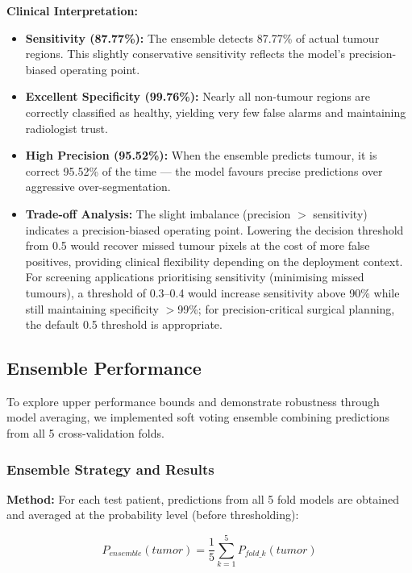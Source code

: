 \documentclass{article}
\begin{document}
\textbf{Clinical Interpretation:}
\begin{itemize}
    \item \textbf{Sensitivity (87.77\%):} The ensemble detects 87.77\% of actual tumour regions. This slightly conservative sensitivity reflects the model's precision-biased operating point.

    \item \textbf{Excellent Specificity (99.76\%):} Nearly all non-tumour regions are correctly classified as healthy, yielding very few false alarms and maintaining radiologist trust.

    \item \textbf{High Precision (95.52\%):} When the ensemble predicts tumour, it is correct 95.52\% of the time — the model favours precise predictions over aggressive over-segmentation.

    \item \textbf{Trade-off Analysis:} The slight imbalance (precision $>$ sensitivity) indicates a precision-biased operating point. Lowering the decision threshold from 0.5 would recover missed tumour pixels at the cost of more false positives, providing clinical flexibility depending on the deployment context. For screening applications prioritising sensitivity (minimising missed tumours), a threshold of 0.3--0.4 would increase sensitivity above 90\% while still maintaining specificity $>$99\%; for precision-critical surgical planning, the default 0.5 threshold is appropriate.
\end{itemize}


\subsection{Ensemble Performance}

To explore upper performance bounds and demonstrate robustness through model averaging, we implemented soft voting ensemble combining predictions from all 5 cross-validation folds.

\subsubsection{Ensemble Strategy and Results}

\textbf{Method:} For each test patient, predictions from all 5 fold models are obtained and averaged at the probability level (before thresholding):

\begin{equation}
P_{ensemble}(tumor) = \frac{1}{5} \sum_{k=1}^{5} P_{fold\_k}(tumor)
\end{equation}
\end{document}
